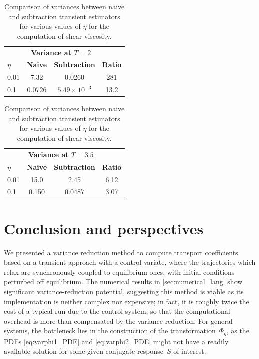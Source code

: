 \documentclass[11pt]{article}
\newcommand\sn[2]{{#1}\times 10^{#2}}
\theoremstyle{definition}
\begin{document}
\begin{table}[h!]
\begin{subtable}[h]{0.45\textwidth}
\centering
\begin{tabular}{lccc}
\toprule
 & \multicolumn{2}{c}{\textbf{Variance at $T=2$}} &  \\
\cmidrule(lr){2-3}
$\eta$ & \textbf{Naive } & \textbf{Subtraction } & \textbf{Ratio} \\
\midrule
0.01 & 7.32 & 0.0260 & 281 \\
0.1 & 0.0726 & $\sn{5.49}{-3}$ & 13.2 \\
\bottomrule
\end{tabular}
\caption{Data at $T=2$ (start of decoupling)}
\end{subtable}\hfill
\begin{subtable}[h]{0.45\textwidth}
\centering
\begin{tabular}{lccc}
\toprule
 & \multicolumn{2}{c}{\textbf{Variance at $T=3.5$}} &  \\
\cmidrule(lr){2-3}
 $\eta$ & \textbf{Naive } & \textbf{Subtraction } & \textbf{Ratio} \\
\midrule
0.01 & 15.0 & 2.45 & 6.12 \\
0.1  & 0.150  & 0.0487 & 3.07 \\
\bottomrule
\end{tabular}
\caption{Data at $T=3.5$ (total decoupling)}
\end{subtable}
\caption{Comparison of variances between naive and subtraction transient estimators for various values of $\eta$ for the computation of shear viscosity.}
\label{table:LJ_shear}
\end{table}

\section{Conclusion and perspectives}
\label{sec:conclusion}
We presented a variance reduction method to compute transport coefficients based on a transient approach with a control variate, where the trajectories which relax are synchronously coupled to equilibrium ones, with initial conditions perturbed off equilibrium. The numerical results in \cref{sec:numerical_lang} show significant variance-reduction potential, suggesting this method is viable as its implementation is neither complex nor expensive; in fact, it is roughly twice the cost of a typical run due to the control system, so that the computational overhead is more than compensated by the variance reduction. For general systems, the bottleneck lies in the construction of the transformation~$\Phi_\eta$, as the PDEs \eqref{eq:varphi1_PDE} and \eqref{eq:varphi2_PDE} might not have a readily available solution for some given conjugate response~$S$ of interest. 
\end{document}
